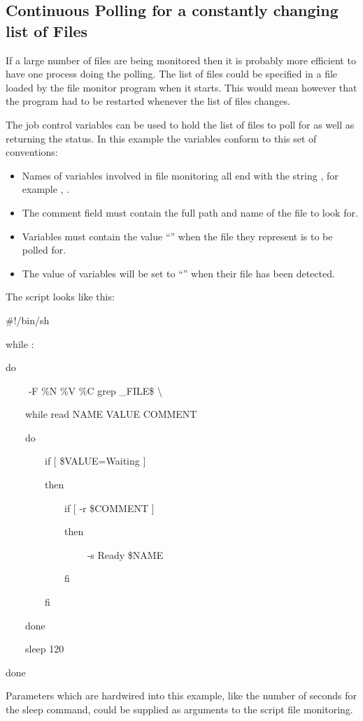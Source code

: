 \subsection{Continuous Polling for a constantly changing list of Files}
If a large number of files are being monitored then it is probably more efficient to have one process doing the polling. The list of files
could be specified in a file loaded by the file monitor program when it starts. This would mean however that the program had to be restarted
whenever the list of files changes.

The job control variables can be used to hold the list of files to poll for as well as returning the
status. In this example the variables conform to this set of conventions:

\begin{itemize}
\item Names of variables involved in file monitoring all end with the string , for example
, .
\item The comment field must contain the full path and name of the file to look for.
\item Variables must contain the value ``'' when the file they represent is to be polled for.
\item The value of variables will be set to ``'' when their file has been detected.
\end{itemize}
The script looks like this:

\begin{exparasmall}

\#!/bin/sh

\bigskip


while :

do

\ \ \ \ \BtvlistName{} -F {\textquotedbl}\%N \%V \%C{\textquotedbl} {\textbar} grep {\textquotesingle}\_FILE\${\textquotesingle} {\textbar}{\textbackslash}

\ \ \ \ while read NAME VALUE COMMENT

\ \ \ \ do

\ \ \ \ \ \ \ \ if [ {\textquotedbl}\$VALUE{\textquotedbl}={\textquotedbl}Waiting{\textquotedbl} ]

\ \ \ \ \ \ \ \ then

\ \ \ \ \ \ \ \ \ \ \ \ if [ -r \$COMMENT ]

\ \ \ \ \ \ \ \ \ \ \ \ then

\ \ \ \ \ \ \ \ \ \ \ \ \ \ \ \ \BtvarName{} -s {\textquotedbl}Ready{\textquotedbl} \$NAME

\ \ \ \ \ \ \ \ \ \ \ \ fi

\ \ \ \ \ \ \ \ fi

\ \ \ \ done

\ \ \ \ sleep 120

done

\end{exparasmall}

Parameters which are hardwired into this example, like the number of seconds for the sleep command, could be supplied as arguments to the
script file monitoring.

